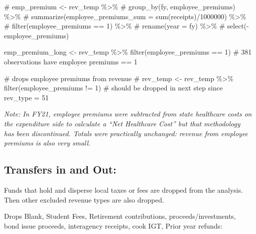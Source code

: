 \documentclass[
  letterpaper,
  DIV=11,
  numbers=noendperiod]{scrreport}
\newenvironment{Shaded}{\begin{snugshade}}{\end{snugshade}}
\newcommand{\CommentTok}[1]{\textcolor[rgb]{0.37,0.37,0.37}{#1}}
\newcommand{\DecValTok}[1]{\textcolor[rgb]{0.68,0.00,0.00}{#1}}
\newcommand{\FunctionTok}[1]{\textcolor[rgb]{0.28,0.35,0.67}{#1}}
\newcommand{\NormalTok}[1]{\textcolor[rgb]{0.00,0.23,0.31}{#1}}
\newcommand{\OtherTok}[1]{\textcolor[rgb]{0.00,0.23,0.31}{#1}}
\newcommand{\SpecialCharTok}[1]{\textcolor[rgb]{0.37,0.37,0.37}{#1}}
\begin{document}
\begin{Shaded}
\begin{Highlighting}[]
\CommentTok{\# emp\_premium \textless{}{-} rev\_temp \%\textgreater{}\%}
\CommentTok{\#   group\_by(fy, employee\_premiums) \%\textgreater{}\%}
\CommentTok{\#   summarize(employee\_premiums\_sum = sum(receipts)/1000000) \%\textgreater{}\%}
\CommentTok{\#   filter(employee\_premiums == 1) \%\textgreater{}\%}
\CommentTok{\#   rename(year = fy) \%\textgreater{}\% }
\CommentTok{\#   select({-}employee\_premiums)}

\NormalTok{emp\_premium\_long }\OtherTok{\textless{}{-}}\NormalTok{ rev\_temp }\SpecialCharTok{\%\textgreater{}\%}  \FunctionTok{filter}\NormalTok{(employee\_premiums }\SpecialCharTok{==} \DecValTok{1}\NormalTok{)}
\CommentTok{\# 381 observations have employee premiums == 1}


\CommentTok{\# drops employee premiums from revenue}
\CommentTok{\# rev\_temp \textless{}{-} rev\_temp \%\textgreater{}\% filter(employee\_premiums != 1)}
\CommentTok{\# should be dropped in next step since rev\_type = 51}
\end{Highlighting}
\end{Shaded}

\emph{Note: In FY21, employee premiums were subtracted from state
healthcare costs on the expenditure side to calculate a ``Net Healthcare
Cost'' but that methodology has been discontinued. Totals were
practically unchanged: revenue from employee premiums is also very
small.}

\hypertarget{transfers-in-and-out}{%
\subsection{Transfers in and Out:}\label{transfers-in-and-out}}

Funds that hold and disperse local taxes or fees are dropped from the
analysis. Then other excluded revenue types are also dropped.

Drops Blank, Student Fees, Retirement contributions,
proceeds/investments, bond issue proceeds, interagency receipts, cook
IGT, Prior year refunds:
\end{document}
